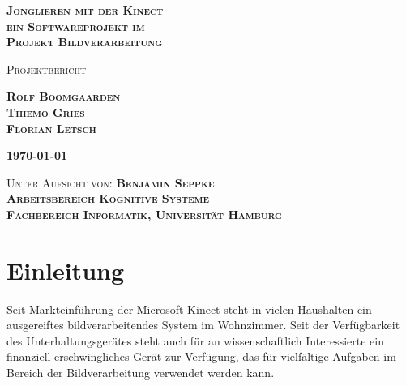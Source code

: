 \documentclass[12pt,a4paper,ngerman]{scrartcl}
\begin{document}
\begin{titlepage}

\vspace*{3 cm}

\begin{flushright}

\bfseries{\Huge\scshape Jonglieren mit der Kinect\\{\Large ein Softwareprojekt im}\\\vspace{0.3cm}Projekt Bildverarbeitung}
\end{flushright}

\vspace{2 cm}

\begin{flushright}
\scshape{\large Projektbericht}
\end{flushright}

\begin{flushright}
\scshape{\LARGE\bfseries Rolf Boomgaarden\\}
\scshape{\LARGE\bfseries Thiemo Gries\\}
\scshape{\LARGE\bfseries Florian Letsch\\}
\end{flushright}

\vspace{2 cm}

\begin{flushright}
\scshape{\large\bfseries \today}
\end{flushright}

\vfill

\begin{flushright}

\scshape{Unter Aufsicht von: {\bfseries Benjamin Seppke}\\}
\scshape{\bfseries Arbeitsbereich Kognitive Systeme\\}
\scshape{\bfseries Fachbereich Informatik, Universität Hamburg\\}
\end{flushright}

\end{titlepage}

\tableofcontents
\newpage

\section{Einleitung}

Seit Markteinführung der Microsoft Kinect steht in vielen
Haushalten ein ausgereiftes bildverarbeitendes System im Wohnzimmer. Seit der
Verfügbarkeit des Unterhaltungsgerätes steht auch für an
wissenschaftlich Interessierte ein finanziell erschwingliches Gerät zur Verfügung,
das für vielfältige Aufgaben im Bereich der Bildverarbeitung verwendet werden kann.
\end{document}
